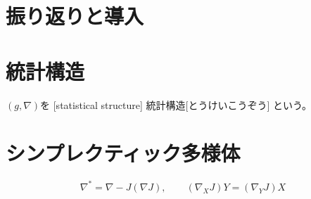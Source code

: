 \documentclass[report]{jlreq}
\begin{document}
%

%
\section*{振り返りと導入}

%
\section{統計構造}

\begin{definition}[統計構造]
    $(g, \nabla)$を
    [statistical structure]
        {統計構造}[とうけいこうぞう]
    という。
\end{definition}

\begin{propdef}
    \TODO{}
\end{propdef}

\begin{theorem}[$D$からの復元]
    \TODO{}
\end{theorem}

%
\section{シンプレクティック多様体}


\begin{definition}[シンプレクティック多様体]
    \TODO{}
\end{definition}

\begin{example}[双対平坦空間]
    \TODO{}
\end{example}

\begin{theorem}[統計構造との両立]
    \begin{equation}
        \nabla^* = \nabla - J(\nabla J),
            \qquad
            (\nabla_X J) Y = (\nabla_Y J) X
    \end{equation}
\end{theorem}
\end{document}

